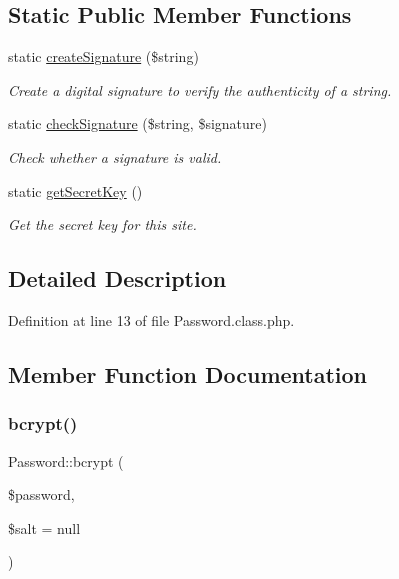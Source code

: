 \subsection*{Static Public Member Functions}
\begin{DoxyCompactItemize}
\item 
static \hyperlink{classPassword_ab68f934440f505f866bbeff9559fbefc}{create\+Signature} (\$string)
\begin{DoxyCompactList}\small\item\em Create a digital signature to verify the authenticity of a string. \end{DoxyCompactList}\item 
static \hyperlink{classPassword_a71ffb4de587c4d3db3cef10bcc8607e8}{check\+Signature} (\$string, \$signature)
\begin{DoxyCompactList}\small\item\em Check whether a signature is valid. \end{DoxyCompactList}\item 
static \hyperlink{classPassword_a34c9775ddb1701f8b136f872559c0fcc}{get\+Secret\+Key} ()
\begin{DoxyCompactList}\small\item\em Get the secret key for this site. \end{DoxyCompactList}\end{DoxyCompactItemize}


\subsection{Detailed Description}


Definition at line 13 of file Password.\+class.\+php.



\subsection{Member Function Documentation}
\hypertarget{classPassword_a097e73abceaf4b976c92471f9b4a2cab}{}\label{classPassword_a097e73abceaf4b976c92471f9b4a2cab} 
\subsubsection{\texorpdfstring{bcrypt()}{bcrypt()}}
{\footnotesize\ttfamily Password\+::bcrypt (\begin{DoxyParamCaption}\item[{}]{\$password,  }\item[{}]{\$salt = {\ttfamily null} }\end{DoxyParamCaption})}



